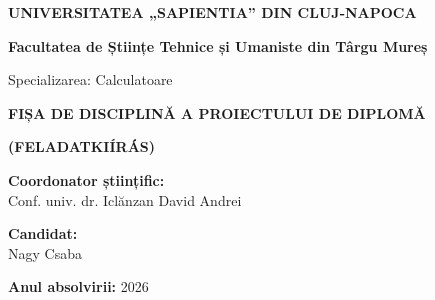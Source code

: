\thispagestyle{empty}

\begin{center}
  {\large\bfseries UNIVERSITATEA „SAPIENTIA” DIN CLUJ-NAPOCA\par}
  {\large\bfseries Facultatea de Științe Tehnice și Umaniste din Târgu Mureș\par}
  {\large Specializarea: Calculatoare\par}
  
  \vspace{1.5cm}
  
  {\Large\bfseries FIȘA DE DISCIPLINĂ A PROIECTULUI DE DIPLOMĂ\par}
  {\Large\bfseries (FELADATKIÍRÁS)\par}
\end{center}

\vspace{1cm}

\noindent
\begin{minipage}[t]{0.50\textwidth}
  {\bfseries Coordonator științific:}\\
  Conf. univ. dr. Iclănzan David Andrei
\end{minipage}\hfill
\begin{minipage}[t]{0.45\textwidth}
  {\bfseries Candidat:}\\
  Nagy Csaba
\end{minipage}

\vspace{0.4cm}
\noindent
{\bfseries Anul absolvirii:} 2026

\vspace{0.8cm}

